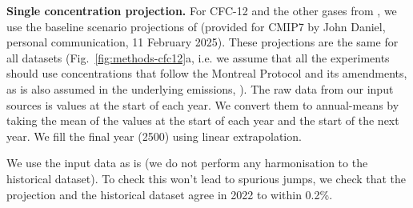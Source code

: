 \textbf{Single concentration projection.}
For CFC-12 and the other gases from \citet{wmo_ozone-ch7_2022},
we use the baseline scenario projections of \citet{wmo_ozone-ch7_2022}
(provided for CMIP7 by John Daniel, personal communication, 11 February 2025).
These projections are the same for all datasets
(Fig.~\ref{fig:methods-cfc12}a, i.e. we assume that all the experiments should use concentrations that follow the Montreal Protocol and its amendments,
as is also assumed in the underlying emissions, \citealp{nicholls_scenariomip-scm-projections_2026}).
The raw data from our input sources is values at the start of each year.
We convert them to annual-means by taking the mean of the values at the start of each year and the start of the next year.
We fill the final year (2500) using linear extrapolation.

We use the input data as is (we do not perform any harmonisation to the historical dataset).
To check this won't lead to spurious jumps, we check that the projection and the historical dataset agree in 2022 to within
0.2\%.

